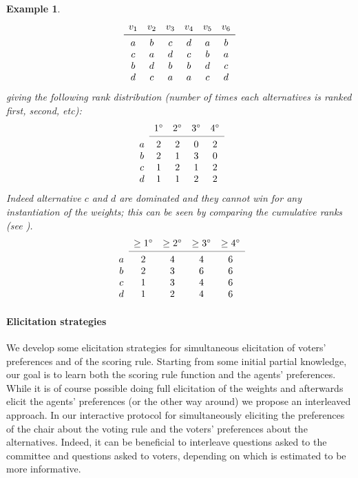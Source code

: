 \documentclass[12pt]{article}
\newtheorem{example}{Example}
\begin{document}
\begin{example}
\[
\begin{array}{cccccc}
v_1& v_2& v_3 & v_4& v_5& v_6 \\
\midrule 
a& b& c & d& a& b \\
c& a& d& c& b& a \\
b& d& b& b& d& c \\
d& c& a& a& c& d \\
\end{array}
\]
giving the following rank distribution (number of times each alternatives is ranked first, second, etc): 
\[
\begin{array}{ccccc}
& 1^\circ& 2^\circ& 3^\circ& 4^\circ \\
\cmidrule{2-5}
a & 2& 2& 0& 2 \\
b& 2& 1& 3& 0 \\
c& 1& 2& 1& 2 \\
d& 1& 1& 2& 2 \\
\end{array}
\]
Indeed alternative $c$ and $d$ are dominated and they cannot win for any instantiation of the weights; this can be seen by comparing the cumulative ranks (see  \cite{Stein1994}).
\[
\begin{array}{ccccc}
& \geq 1^\circ
& \geq 2^\circ
& \geq 3^\circ
& \geq 4^\circ \\
\cmidrule{2-5}
a & 2 & 4& 4& 6 \\
b & 2 & 3& 6& 6 \\
c& 1& 3& 4& 6 \\
d& 1& 2& 4& 6 \\
\end{array}
\]
\end{example}



\paragraph{Elicitation strategies}

We develop some elicitation strategies for simultaneous elicitation of voters' preferences and of the scoring rule.
Starting from some initial partial knowledge, our goal is to learn both the scoring rule function and the agents' preferences.
While it is of course possible doing full elicitation of the weights and afterwards elicit the agents' preferences (or the other way around) we propose an interleaved approach.
In our interactive  protocol for simultaneously eliciting the preferences of the chair about the voting rule and the voters' preferences about the alternatives.
Indeed, it can be beneficial to interleave questions asked to the committee and questions asked to voters, depending on which is estimated to be more informative.
\end{document}
